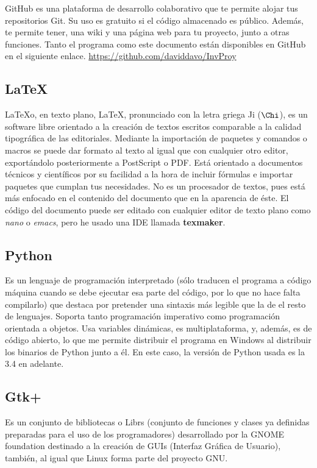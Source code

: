 \documentclass[a4paper, 11pt, twoside]{report} %
\begin{document}
GitHub es una plataforma de desarrollo colaborativo que te permite alojar tus repositorios Git. Su uso es gratuito si el código almacenado es público. Además, te permite tener, una wiki y una página web para tu proyecto, junto a otras funciones.
Tanto el programa como este documento están disponibles en GitHub en el siguiente enlace. \url{https://github.com/daviddavo/InvProy}

\subsection{LaTeX}
\LaTeX\space o, en texto plano, LaTeX, pronunciado con la letra griega 
Ji ($\Chi$), es un software libre orientado a la creación de textos escritos comparable a la calidad tipográfica de las editoriales. Mediante la importación de paquetes y comandos o macros se puede dar formato al texto al igual que con cualquier otro editor, exportándolo posteriormente a PostScript o PDF. Está orientado a documentos técnicos y científicos por su facilidad a la hora de incluir fórmulas e importar paquetes que cumplan tus necesidades. No es un procesador de textos, pues está más enfocado en el contenido del documento que en la aparencia de éste.
El código del documento puede ser editado con cualquier editor de texto plano como \textit{nano} o \textit{emacs}, pero he usado una IDE llamada \textbf{texmaker}.

\subsection{Python}
Es un lenguaje de programación interpretado (sólo traducen el programa a código máquina cuando se debe ejecutar esa parte del código, por lo que no hace falta compilarlo) que destaca por pretender una sintaxis más legible que la de el resto de lenguajes. Soporta tanto programación imperativo como programación orientada a objetos. Usa variables dinámicas, es multiplataforma, y, además, es de código abierto, lo que me permite distribuir el programa en Windows al distribuir los binarios de Python junto a él. En este caso, la versión de Python usada es la 3.4 en adelante.

\subsection{Gtk+}
Es un conjunto de bibliotecas o \glspl{Libr} (conjunto de funciones y clases ya definidas preparadas para el uso de los programadores) desarrollado por la GNOME foundation destinado a la creación de GUIs (Interfaz Gráfica de Usuario), también, al igual que Linux forma parte del proyecto GNU.
\end{document}
